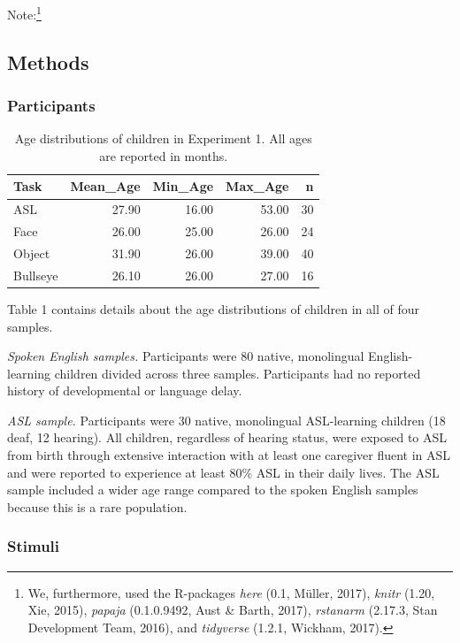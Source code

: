 \documentclass[english,man]{apa6}
\theoremstyle{definition}
\theoremstyle{definition}
\theoremstyle{definition}
\theoremstyle{remark}
\begin{document}
Note:\footnote{We, furthermore, used the R-packages \emph{here} (0.1,
  Müller, 2017), \emph{knitr} (1.20, Xie, 2015), \emph{papaja}
  (0.1.0.9492, Aust \& Barth, 2017), \emph{rstanarm} (2.17.3, Stan
  Development Team, 2016), and \emph{tidyverse} (1.2.1, Wickham, 2017).}

\hypertarget{methods}{%
\subsection{Methods}\label{methods}}

\hypertarget{participants}{%
\subsubsection{Participants}\label{participants}}

\begin{table}[b]
\centering
\begin{tabular}{lrrrr}
  \hline
Task & Mean\_Age & Min\_Age & Max\_Age & n \\ 
  \hline
ASL & 27.90 & 16.00 & 53.00 &  30 \\ 
  Face & 26.00 & 25.00 & 26.00 &  24 \\ 
  Object & 31.90 & 26.00 & 39.00 &  40 \\ 
  Bullseye & 26.10 & 26.00 & 27.00 &  16 \\ 
   \hline
\end{tabular}
\caption{Age distributions of children in Experiment 1. All ages are reported in months.} 
\end{table}

Table 1 contains details about the age distributions of children in all
of four samples.

\emph{Spoken English samples.} Participants were 80 native, monolingual
English-learning children divided across three samples. Participants had
no reported history of developmental or language delay.

\emph{ASL sample.} Participants were 30 native, monolingual ASL-learning
children (18 deaf, 12 hearing). All children, regardless of hearing
status, were exposed to ASL from birth through extensive interaction
with at least one caregiver fluent in ASL and were reported to
experience at least 80\% ASL in their daily lives. The ASL sample
included a wider age range compared to the spoken English samples
because this is a rare population.

\hypertarget{stimuli}{%
\subsubsection{Stimuli}\label{stimuli}}
\end{document}
